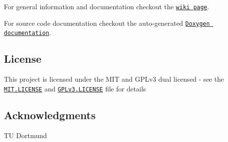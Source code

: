 \begin{DoxyItemize}
\item For general information and documentation checkout the \href{https://github.com/Autonomous-Racing-PG/ros.package/wiki}{\tt wiki page}.
\item For source code documentation checkout the auto-\/generated \href{https://autonomous-racing-pg.github.io/ros.package/html/index.html}{\tt Doxygen documentation}.
\end{DoxyItemize}

\subsection*{License}

This project is licensed under the M\+IT and G\+P\+Lv3 dual licensed -\/ see the \href{MIT.LICENSE}{\tt M\+I\+T.\+L\+I\+C\+E\+N\+SE} and \href{GPLv3.LICENSE}{\tt G\+P\+Lv3.\+L\+I\+C\+E\+N\+SE} file for details

\subsection*{Acknowledgments}


\begin{DoxyItemize}
\item TU Dortmund 
\end{DoxyItemize}
